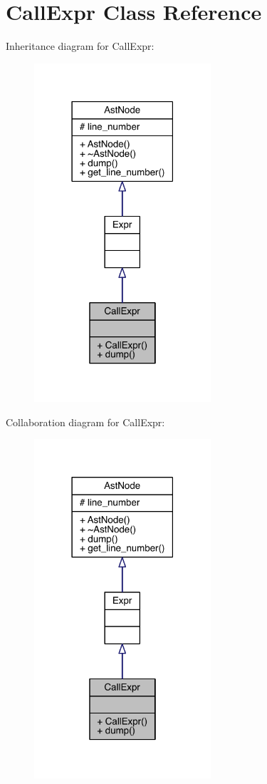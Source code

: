 \hypertarget{class_call_expr}{}\section{Call\+Expr Class Reference}
\label{class_call_expr}


Inheritance diagram for Call\+Expr\+:\nopagebreak
\begin{figure}[H]
\begin{center}
\leavevmode
\includegraphics[width=186pt]{class_call_expr__inherit__graph}
\end{center}
\end{figure}


Collaboration diagram for Call\+Expr\+:\nopagebreak
\begin{figure}[H]
\begin{center}
\leavevmode
\includegraphics[width=186pt]{class_call_expr__coll__graph}
\end{center}
\end{figure}
